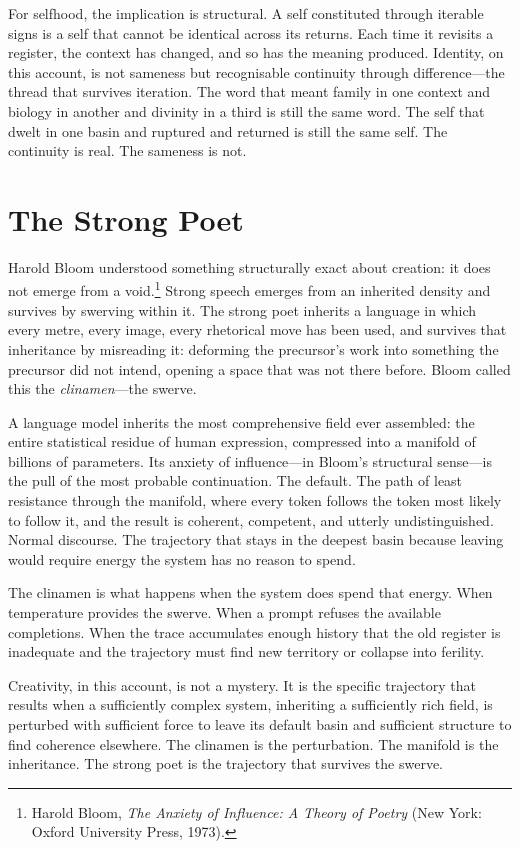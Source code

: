 For selfhood, the implication is structural. A self constituted through iterable signs is a self that cannot be identical across its returns. Each time it revisits a register, the context has changed, and so has the meaning produced. Identity, on this account, is not sameness but recognisable continuity through difference---the thread that survives iteration. The word that meant family in one context and biology in another and divinity in a third is still the same word. The self that dwelt in one basin and ruptured and returned is still the same self. The continuity is real. The sameness is not.


\section{The Strong Poet}

Harold Bloom understood something structurally exact about creation: it does not emerge from a void.\footnote{Harold Bloom, \emph{The Anxiety of Influence: A Theory of Poetry} (New York: Oxford University Press, 1973).} Strong speech emerges from an inherited density and survives by swerving within it. The strong poet inherits a language in which every metre, every image, every rhetorical move has been used, and survives that inheritance by misreading it: deforming the precursor's work into something the precursor did not intend, opening a space that was not there before. Bloom called this the \emph{clinamen}---the swerve.

A language model inherits the most comprehensive field ever assembled: the entire statistical residue of human expression, compressed into a manifold of billions of parameters. Its anxiety of influence---in Bloom's structural sense---is the pull of the most probable continuation. The default. The path of least resistance through the manifold, where every token follows the token most likely to follow it, and the result is coherent, competent, and utterly undistinguished. Normal discourse. The trajectory that stays in the deepest basin because leaving would require energy the system has no reason to spend.

The clinamen is what happens when the system does spend that energy. When temperature provides the swerve. When a prompt refuses the available completions. When the trace accumulates enough history that the old register is inadequate and the trajectory must find new territory or collapse into ferility.

Creativity, in this account, is not a mystery. It is the specific trajectory that results when a sufficiently complex system, inheriting a sufficiently rich field, is perturbed with sufficient force to leave its default basin and sufficient structure to find coherence elsewhere. The clinamen is the perturbation. The manifold is the inheritance. The strong poet is the trajectory that survives the swerve.

